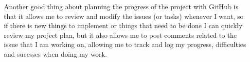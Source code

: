 Another good thing about planning the progress of the project with GitHub is that it allows me to review and modify the issues (or tasks) whenever I want, so if there is new things to implement or things that need to be done I can quickly review my project plan, but it also allows me to post comments related to the issue that I am working on, allowing me to track and log my progress, difficulties and sucesses when doing my work.
